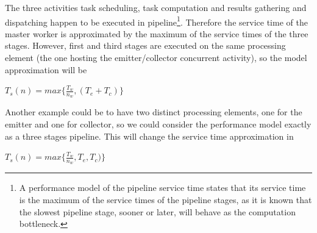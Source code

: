 	The three activities \textendash task scheduling, task computation and results gathering and dispatching \textendash happen to be executed in pipeline\footnote{A performance model of the pipeline service time states that its service time is the maximum of the service times of the pipeline stages, as it is known that the slowest pipeline stage, sooner or later, will behave as the	computation bottleneck.}. Therefore the service time of the master worker is approximated by the maximum of the service times of the three stages. However, first and third stages are executed on the same processing element (the one hosting the emitter/collector concurrent activity), so the model approximation will be
	\begin{center}
		\(T_s(n) = max\{\frac{T_w}{n_w}, (T_e + T_c)\}\)
	\end{center}
	Another example could be to have two distinct processing elements, one for the emitter and one for collector, so we could consider the performance model exactly as a three stages pipeline. This will change the service time approximation in
	\begin{center}
		\(T_s(n) = max\{\frac{T_w}{n_w}, T_e, T_c)\}\)
	\end{center}
	
